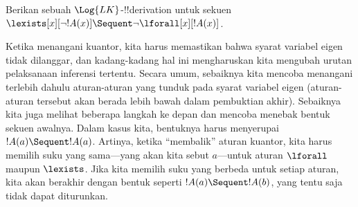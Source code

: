 \documentclass[../../../include/open-logic-section]{subfiles}
\begin{document}


\begin{ex}
Berikan sebuah $\Log{LK}$-!!{derivation} untuk sekuen
$\lexists[x][\lnot !A(x)] \Sequent \lnot \lforall[x][!A(x)]$.

Ketika menangani kuantor, kita harus memastikan bahwa syarat variabel
eigen tidak dilanggar, dan kadang-kadang hal ini mengharuskan kita mengubah
urutan pelaksanaan inferensi tertentu. Secara umum, sebaiknya kita mencoba
menangani terlebih dahulu aturan-aturan yang tunduk pada syarat variabel
eigen (aturan-aturan tersebut akan berada lebih bawah dalam pembuktian
akhir). Sebaiknya kita juga melihat beberapa langkah ke depan dan mencoba
menebak bentuk sekuen awalnya. Dalam kasus kita, bentuknya harus menyerupai
$!A(a) \Sequent !A(a)$. Artinya, ketika ``membalik'' aturan kuantor, kita
harus memilih suku yang sama---yang akan kita sebut $a$---untuk aturan
$\lforall$ maupun $\lexists$. Jika kita memilih suku yang berbeda untuk
setiap aturan, kita akan berakhir dengan bentuk seperti $!A(a) \Sequent
!A(b)$, yang tentu saja tidak dapat diturunkan.


\end{ex}
\end{document}
